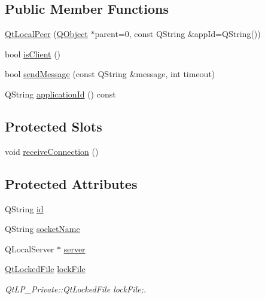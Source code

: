 \subsection*{Public Member Functions}
\begin{DoxyCompactItemize}
\item 
\hyperlink{class_qt_local_peer_a7f6f94203a6ece5b14c8c800da1e40ab}{Qt\-Local\-Peer} (\hyperlink{class_q_object}{Q\-Object} $\ast$parent=0, const Q\-String \&app\-Id=Q\-String())
\item 
bool \hyperlink{class_qt_local_peer_a72f4ec6cda404661094778f98296d2a9}{is\-Client} ()
\item 
bool \hyperlink{class_qt_local_peer_ab239cb6dcea36512d43df6ca07881ea7}{send\-Message} (const Q\-String \&message, int timeout)
\item 
Q\-String \hyperlink{class_qt_local_peer_a2f7d615b1eebd738a4025894d8e213d4}{application\-Id} () const 
\end{DoxyCompactItemize}
\subsection*{Protected Slots}
\begin{DoxyCompactItemize}
\item 
void \hyperlink{class_qt_local_peer_afb29397e8af380cac78af0b7535121d2}{receive\-Connection} ()
\end{DoxyCompactItemize}
\subsection*{Protected Attributes}
\begin{DoxyCompactItemize}
\item 
Q\-String \hyperlink{class_qt_local_peer_a89ee3139c0e2515e081a2b5de98beda6}{id}
\item 
Q\-String \hyperlink{class_qt_local_peer_a2c86a18c237bdfe4bd0565d3cc413cd8}{socket\-Name}
\item 
Q\-Local\-Server $\ast$ \hyperlink{class_qt_local_peer_af400ab8eb001ef4790541069a5d0e292}{server}
\item 
\hyperlink{class_qt_locked_file}{Qt\-Locked\-File} \hyperlink{class_qt_local_peer_ab72488160eed35c9518ef3de1e6062cf}{lock\-File}
\begin{DoxyCompactList}\small\item\em Qt\-L\-P\-\_\-\-Private\-::\-Qt\-Locked\-File lock\-File;. \end{DoxyCompactList}\end{DoxyCompactItemize}



